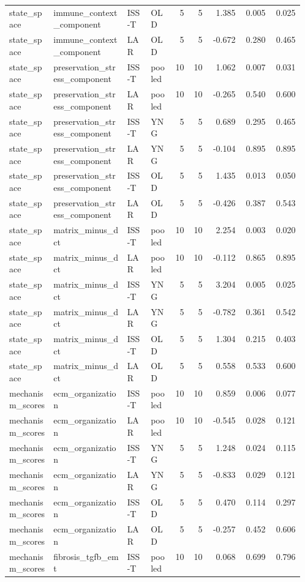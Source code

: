 \documentclass[11pt]{article}
\begin{document}
\begin{landscape}
\begin{longtable}{p{0.15\linewidth}p{0.25\linewidth}p{0.08\linewidth}p{0.08\linewidth}rrrrr}
state\_space & immune\_context\_component & ISS-T & OLD & 5 & 5 & 1.385 & 0.005 & 0.025 \\
state\_space & immune\_context\_component & LAR & OLD & 5 & 5 & -0.672 & 0.280 & 0.465 \\
state\_space & preservation\_stress\_component & ISS-T & pooled & 10 & 10 & 1.062 & 0.007 & 0.031 \\
state\_space & preservation\_stress\_component & LAR & pooled & 10 & 10 & -0.265 & 0.540 & 0.600 \\
state\_space & preservation\_stress\_component & ISS-T & YNG & 5 & 5 & 0.689 & 0.295 & 0.465 \\
state\_space & preservation\_stress\_component & LAR & YNG & 5 & 5 & -0.104 & 0.895 & 0.895 \\
state\_space & preservation\_stress\_component & ISS-T & OLD & 5 & 5 & 1.435 & 0.013 & 0.050 \\
state\_space & preservation\_stress\_component & LAR & OLD & 5 & 5 & -0.426 & 0.387 & 0.543 \\
state\_space & matrix\_minus\_dct & ISS-T & pooled & 10 & 10 & 2.254 & 0.003 & 0.020 \\
state\_space & matrix\_minus\_dct & LAR & pooled & 10 & 10 & -0.112 & 0.865 & 0.895 \\
state\_space & matrix\_minus\_dct & ISS-T & YNG & 5 & 5 & 3.204 & 0.005 & 0.025 \\
state\_space & matrix\_minus\_dct & LAR & YNG & 5 & 5 & -0.782 & 0.361 & 0.542 \\
state\_space & matrix\_minus\_dct & ISS-T & OLD & 5 & 5 & 1.304 & 0.215 & 0.403 \\
state\_space & matrix\_minus\_dct & LAR & OLD & 5 & 5 & 0.558 & 0.533 & 0.600 \\
mechanism\_scores & ecm\_organization & ISS-T & pooled & 10 & 10 & 0.859 & 0.006 & 0.077 \\
mechanism\_scores & ecm\_organization & LAR & pooled & 10 & 10 & -0.545 & 0.028 & 0.121 \\
mechanism\_scores & ecm\_organization & ISS-T & YNG & 5 & 5 & 1.248 & 0.024 & 0.115 \\
mechanism\_scores & ecm\_organization & LAR & YNG & 5 & 5 & -0.833 & 0.029 & 0.121 \\
mechanism\_scores & ecm\_organization & ISS-T & OLD & 5 & 5 & 0.470 & 0.114 & 0.297 \\
mechanism\_scores & ecm\_organization & LAR & OLD & 5 & 5 & -0.257 & 0.452 & 0.606 \\
mechanism\_scores & fibrosis\_tgfb\_emt & ISS-T & pooled & 10 & 10 & 0.068 & 0.699 & 0.796 \\

\end{longtable}
\end{landscape}
\end{document}
